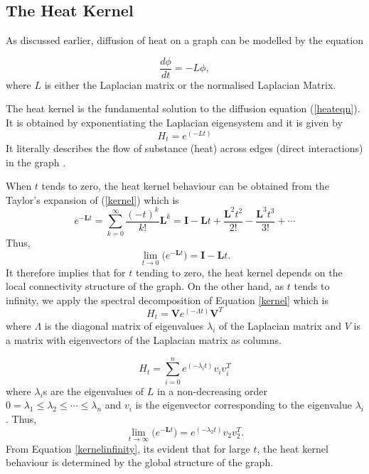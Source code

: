 \documentclass[12pt]{article}
\begin{document}
\subsection{The Heat Kernel}
As discussed earlier, diffusion of heat on a graph can be modelled by the equation 

\begin{equation}
\frac{d \phi}{dt} = -L \phi,
\label{heateqn}
\end{equation}
where $L$ is either the Laplacian matrix or the normalised Laplacian Matrix. 

The heat kernel is the fundamental solution to the diffusion equation (\ref{heateqn}). It is obtained by exponentiating the Laplacian eigensystem and it is given by
\begin{equation}
H_t = e^{(-Lt) }
\label{kernel}
\end{equation}
It literally describes the flow of substance (heat) across edges (direct interactions) in the graph \citep{xiao2009graph}.

When $t$ tends to zero, the heat kernel behaviour can be obtained from the Taylor's expansion of (\ref{kernel}) which is 
\begin{equation}
e^{-\mathbf{L}t} = \sum_{k=0}^{\infty} \frac{(-t)^k}{k!} \mathbf{L}^k = \mathbf{I} -\mathbf{L}t + \frac{\mathbf{L}^2 t^2}{2!} - \frac{\mathbf{L}^3 t^3}{3!}+ \cdots
\end{equation}
Thus,
\begin{equation}
\lim_{t\longrightarrow 0} \Big(e^{-\mathbf{L}t}\Big) = \mathbf{I} - \mathbf{L}t.
\label{kerneltozero}
\end{equation}
It therefore implies that for $t$ tending to zero, the heat kernel depends on the local connectivity structure of the graph.
On the other hand, as $t$ tends to infinity, we apply the spectral decomposition of Equation \ref{kernel} which is 
\begin{equation}
H_t = \mathbf{V} e^{(-\Lambda t)} \mathbf{V}^T 
\end{equation}
where $\Lambda$ is the diagonal matrix of eigenvalues $\lambda_i$ of the Laplacian matrix and $V$ is a matrix with eigenvectors of the Laplacian matrix as columns. 

\begin{equation}
H_t =  \sum_{i=0}^n e^{(-\lambda_i t)} v_i v_i^T 
\end{equation}
where $\lambda_i$s are the eigenvalues of $L$ in a non-decreasing order $0=\lambda_1 \leq  \lambda_2 \leq \cdots \leq \lambda_n$ and $v_i$ is the eigenvector corresponding to the eigenvalue $\lambda_i$. 
Thus,
\begin{equation}
\lim_{t\longrightarrow \infty} \Big(e^{-\mathbf{L}t}\Big) = e^{(-\lambda_2 t)} v_2 v _2^T.
\label{kernelinfinity}  
\end{equation}
From Equation \ref{kernelinfinity}, its evident that for large $t$, the heat kernel behaviour is determined by the global structure of the graph. 
\end{document}
